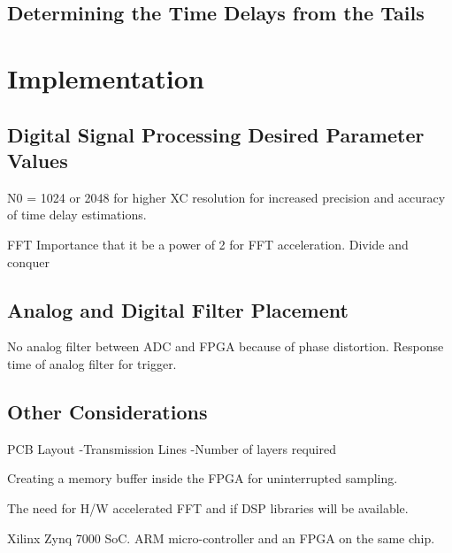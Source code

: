\documentclass[12pt]{article}
\begin{document}
\subsection{Determining the Time Delays from the Tails}

\section{Implementation}

\subsection{Digital Signal Processing Desired Parameter Values}
	N0 = 1024 or 2048 for higher XC resolution for increased precision and accuracy of time delay estimations.
    
    FFT
    	Importance that it be a power of 2 for FFT acceleration.
    	Divide and conquer

\subsection{Analog and Digital Filter Placement}
	No analog filter between ADC and FPGA because of phase distortion.
    Response time of analog filter for trigger.

\subsection{Other Considerations}
	PCB Layout
    	-Transmission Lines
        -Number of layers required

	Creating a memory buffer inside the FPGA for uninterrupted sampling.
    
    The need for H/W accelerated FFT and if DSP libraries will be available.
    
    Xilinx Zynq 7000 SoC. ARM micro-controller and an FPGA on the same chip.
\end{document}
